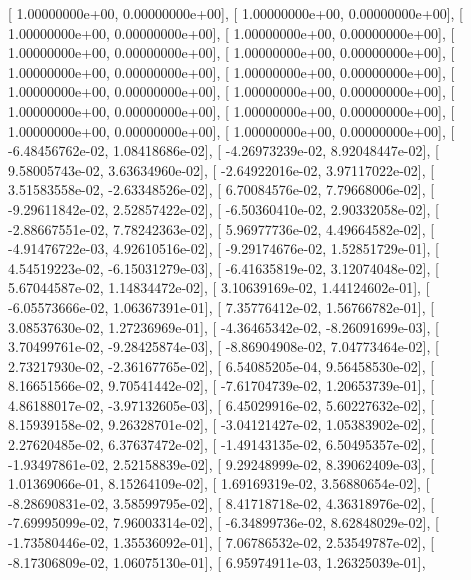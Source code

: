 \documentclass{article}
\begin{document}
       [  1.00000000e+00,   0.00000000e+00],
       [  1.00000000e+00,   0.00000000e+00],
       [  1.00000000e+00,   0.00000000e+00],
       [  1.00000000e+00,   0.00000000e+00],
       [  1.00000000e+00,   0.00000000e+00],
       [  1.00000000e+00,   0.00000000e+00],
       [  1.00000000e+00,   0.00000000e+00],
       [  1.00000000e+00,   0.00000000e+00],
       [  1.00000000e+00,   0.00000000e+00],
       [  1.00000000e+00,   0.00000000e+00],
       [  1.00000000e+00,   0.00000000e+00],
       [  1.00000000e+00,   0.00000000e+00],
       [  1.00000000e+00,   0.00000000e+00],
       [  1.00000000e+00,   0.00000000e+00],
       [ -6.48456762e-02,   1.08418686e-02],
       [ -4.26973239e-02,   8.92048447e-02],
       [  9.58005743e-02,   3.63634960e-02],
       [ -2.64922016e-02,   3.97117022e-02],
       [  3.51583558e-02,  -2.63348526e-02],
       [  6.70084576e-02,   7.79668006e-02],
       [ -9.29611842e-02,   2.52857422e-02],
       [ -6.50360410e-02,   2.90332058e-02],
       [ -2.88667551e-02,   7.78242363e-02],
       [  5.96977736e-02,   4.49664582e-02],
       [ -4.91476722e-03,   4.92610516e-02],
       [ -9.29174676e-02,   1.52851729e-01],
       [  4.54519223e-02,  -6.15031279e-03],
       [ -6.41635819e-02,   3.12074048e-02],
       [  5.67044587e-02,   1.14834472e-02],
       [  3.10639169e-02,   1.44124602e-01],
       [ -6.05573666e-02,   1.06367391e-01],
       [  7.35776412e-02,   1.56766782e-01],
       [  3.08537630e-02,   1.27236969e-01],
       [ -4.36465342e-02,  -8.26091699e-03],
       [  3.70499761e-02,  -9.28425874e-03],
       [ -8.86904908e-02,   7.04773464e-02],
       [  2.73217930e-02,  -2.36167765e-02],
       [  6.54085205e-04,   9.56458530e-02],
       [  8.16651566e-02,   9.70541442e-02],
       [ -7.61704739e-02,   1.20653739e-01],
       [  4.86188017e-02,  -3.97132605e-03],
       [  6.45029916e-02,   5.60227632e-02],
       [  8.15939158e-02,   9.26328701e-02],
       [ -3.04121427e-02,   1.05383902e-02],
       [  2.27620485e-02,   6.37637472e-02],
       [ -1.49143135e-02,   6.50495357e-02],
       [ -1.93497861e-02,   2.52158839e-02],
       [  9.29248999e-02,   8.39062409e-03],
       [  1.01369066e-01,   8.15264109e-02],
       [  1.69169319e-02,   3.56880654e-02],
       [ -8.28690831e-02,   3.58599795e-02],
       [  8.41718718e-02,   4.36318976e-02],
       [ -7.69995099e-02,   7.96003314e-02],
       [ -6.34899736e-02,   8.62848029e-02],
       [ -1.73580446e-02,   1.35536092e-01],
       [  7.06786532e-02,   2.53549787e-02],
       [ -8.17306809e-02,   1.06075130e-01],
       [  6.95974911e-03,   1.26325039e-01],
\end{document}
